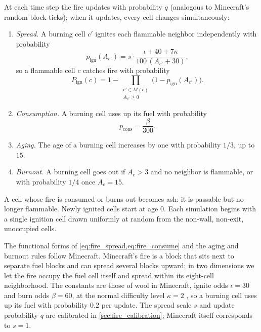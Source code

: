 At each time step the fire updates with probability $q$ (analogous to Minecraft's random
block ticks); when it updates, every cell changes simultaneously:
\begin{enumerate}
  \item \emph{Spread.} A burning cell $c'$ ignites each flammable neighbor independently
  with probability
  \begin{equation}\label{eq:fire_spread}
    p_{\text{ign}}(A_{c'}) = s \cdot \frac{\iota + 40 + 7\kappa}{100\,(A_{c'} + 30)},
  \end{equation}
  so a flammable cell $c$ catches fire with probability
  \begin{equation}\label{eq:fire_ignite}
    P_{\text{ign}}(c) = 1 - \prod_{\substack{c' \in M(c) \\ A_{c'} \ge 0}}
    \bigl(1 - p_{\text{ign}}(A_{c'})\bigr).
  \end{equation}
  \item \emph{Consumption.} A burning cell uses up its fuel with probability
  \begin{equation}\label{eq:fire_consume}
    p_{\text{cons}} = \frac{\beta}{300}.
  \end{equation}
  \item \emph{Aging.} The age of a burning cell increases by one with probability $1/3$,
  up to $15$.
  \item \emph{Burnout.} A burning cell goes out if $A_c > 3$ and no neighbor is flammable,
  or with probability $1/4$ once $A_c = 15$.
\end{enumerate}
A cell whose fire is consumed or burns out becomes ash: it is passable but no longer
flammable. Newly ignited cells start at age $0$. Each simulation begins with a single
ignition cell drawn uniformly at random from the non-wall, non-exit, unoccupied cells.

The functional forms of \cref{eq:fire_spread,eq:fire_consume} and the aging and burnout
rules follow Minecraft. Minecraft's fire is a block that sits next to separate fuel blocks
and can spread several blocks upward; in two dimensions we let the fire occupy the fuel
cell itself and spread within its eight-cell neighborhood. The constants are those of
wool in Minecraft, ignite odds $\iota = 30$ and burn odds $\beta = 60$, at the normal
difficulty level $\kappa = 2$ \cite{minecraftfire}, so a burning cell uses up its fuel
with probability $0.2$ per update. The spread scale $s$ and update probability $q$ are
calibrated in \cref{sec:fire_calibration}; Minecraft itself corresponds to $s = 1$.

